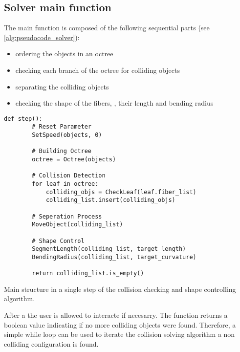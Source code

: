 \subsection{Solver main function}
%
The main function is composed of the following sequential parts (see \cref{alg:pseudocode_solver}):
% 
\begin{itemize}
    \item ordering the objects in an octree
    \item checking each branch of the octree for colliding objects
    \item separating the colliding objects
    \item checking the shape of the fibers, \ie{}, their length and bending radius
\end{itemize}
% 
\begin{lstfloat}[!tb]
    \lstset{style=python}
    \begin{lstlisting}[]
    def step():
        # Reset Parameter
        SetSpeed(objects, 0)
       
        # Building Octree
        octree = Octree(objects)
       
        # Collision Detection
        for leaf in octree:
            colliding_objs = CheckLeaf(leaf.fiber_list)
            colliding_list.insert(colliding_objs)
    
        # Seperation Process
        MoveObject(colliding_list)
    
        # Shape Control
        SegmentLength(colliding_list, target_length)
        BendingRadius(colliding_list, target_curvature)
    
        return colliding_list.is_empty()
    \end{lstlisting}
    \caption{Main structure in a single step of the collision checking and shape controlling algorithm.}
    \label{alg:pseudocode_solver}
\end{lstfloat}
% 
After a  the user is allowed to interacte if necesarry.
The function returns a boolean value indicating if no more colliding objects were found.
Therefore, a simple while loop can be used to iterate the collision solving algorithm a non colliding configuration is found.
%
%
%
